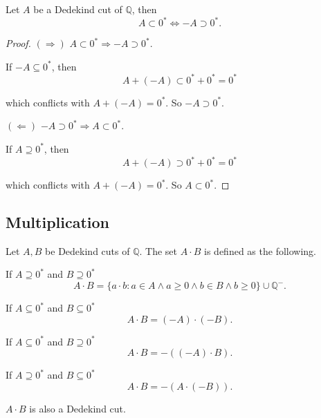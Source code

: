 \begin{theorem}\label{theorem:chapter1:negation-and-sign}
    Let $A$ be a Dedekind cut of $\mathbb{Q}$, then
    \[
        A\subset {0}^{*} \Longleftrightarrow -A\supset {0}^{*}.
    \]
\end{theorem}

\begin{proof}
    $(\Rightarrow)$ $A\subset {0}^{*}\Longrightarrow -A\supset {0}^{*}$.

    If $-A\subseteq {0}^{*}$, then
    \[
        A + (-A) \subset {0}^{*} + {0}^{*} = {0}^{*}
    \]

    which conflicts with $A + (-A) = {0}^{*}$. So $-A\supset {0}^{*}$.
    \bigskip

    $(\Leftarrow)$ $-A\supset {0}^{*}\Longrightarrow A\subset {0}^{*}$.

    If $A\supseteq {0}^{*}$, then
    \[
        A + (-A) \supset {0}^{*} + {0}^{*} = {0}^{*}
    \]

    which conflicts with $A + (-A) = {0}^{*}$. So $A\subset {0}^{*}$.
\end{proof}

\subsection{Multiplication}

\begin{theorem}[Multiplication]\label{theorem:chapter1:multiplication}
    Let $A, B$ be Dedekind cuts of $\mathbb{Q}$. The set $A\cdot B$ is defined as the following.

    If $A\supseteq{0}^{*}$ and $B\supseteq{0}^{*}$
    \[
        A\cdot B = \{ a\cdot b : a\in A\wedge a\ge 0 \wedge b\in B\wedge b\ge 0 \} \cup \mathbb{Q}^{-}.
    \]

    If $A\subseteq{0}^{*}$ and $B\subseteq{0}^{*}$
    \[
        A\cdot B = (-A)\cdot (-B).
    \]

    If $A\subseteq{0}^{*}$ and $B\supseteq{0}^{*}$
    \[
        A\cdot B = -\left((-A)\cdot B\right).
    \]

    If $A\supseteq{0}^{*}$ and $B\subseteq{0}^{*}$
    \[
        A\cdot B = -\left(A\cdot (-B)\right).
    \]

    $A\cdot B$ is also a Dedekind cut.
\end{theorem}

